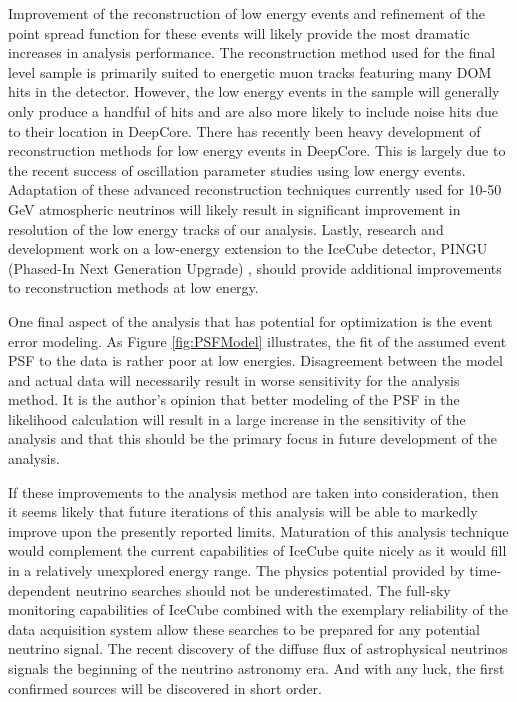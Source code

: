 \documentclass{gatech-thesis}
\begin{document}
Improvement of the reconstruction of low energy events and refinement of the point spread function for these events will likely provide the most dramatic increases in analysis performance. The reconstruction method used for the final level sample is primarily suited to energetic muon tracks featuring many DOM hits in the detector. However, the low energy events in the sample will generally only produce a handful of hits and are also more likely to include noise hits due to their location in DeepCore. There has recently been heavy development of reconstruction methods for low energy events in DeepCore. This is largely due to the recent success of oscillation parameter studies using low energy events. Adaptation of these advanced reconstruction techniques currently used for 10-50 GeV atmospheric neutrinos will likely result in significant improvement in resolution of the low energy tracks of our analysis. Lastly, research and development work on a low-energy extension to the IceCube detector, PINGU (Phased-In Next Generation Upgrade) \cite{2014arXiv1401.2046T}, should provide additional improvements to reconstruction methods at low energy.

One final aspect of the analysis that has potential for optimization is the event error modeling. As Figure \ref{fig:PSFModel} illustrates, the fit of the assumed event PSF to the data is rather poor at low energies. Disagreement between the model and actual data will necessarily result in worse sensitivity for the analysis method. It is the author's opinion that better modeling of the PSF in the likelihood calculation will result in a large increase in the sensitivity of the analysis and that this should be the primary focus in future development of the analysis.

If these improvements to the analysis method are taken into consideration, then it seems likely that future iterations of this analysis will be able to markedly improve upon the presently reported limits. Maturation of this analysis technique would complement the current capabilities of IceCube quite nicely as it would fill in a relatively unexplored energy range. The physics potential provided by time-dependent neutrino searches should not be underestimated. The full-sky monitoring capabilities of IceCube combined with the exemplary reliability of the data acquisition system allow these searches to be prepared for any potential neutrino signal. The recent discovery of the diffuse flux of astrophysical neutrinos signals the beginning of the neutrino astronomy era. And with any luck, the first confirmed sources will be discovered in short order.
\end{document}
